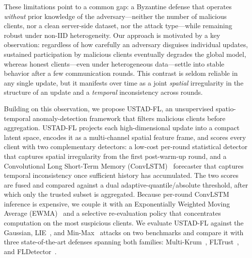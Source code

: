 \documentclass[journal]{IEEEtran}
\begin{document}
These limitations point to a common gap: a Byzantine defense that operates \emph{without} prior knowledge of the adversary---neither the number of malicious clients, nor a clean server-side dataset, nor the attack type---while remaining robust under non-IID heterogeneity. Our approach is motivated by a key observation: regardless of how carefully an adversary disguises individual updates, sustained participation by malicious clients eventually degrades the global model, whereas honest clients---even under heterogeneous data---settle into stable behavior after a few communication rounds. This contrast is seldom reliable in any single update, but it manifests over time as a joint \emph{spatial} irregularity in the structure of an update and a \emph{temporal} inconsistency across rounds.

Building on this observation, we propose USTAD-FL, an unsupervised spatio-temporal anomaly-detection framework that filters malicious clients before aggregation. USTAD-FL projects each high-dimensional update into a compact latent space, encodes it as a multi-channel spatial feature frame, and scores every client with two complementary detectors: a low-cost per-round statistical detector that captures spatial irregularity from the first post-warm-up round, and a Convolutional Long Short-Term Memory (ConvLSTM)~\cite{shi2015convolutional} forecaster that captures temporal inconsistency once sufficient history has accumulated. The two scores are fused and compared against a dual adaptive-quantile/absolute threshold, after which only the trusted subset is aggregated. Because per-round ConvLSTM inference is expensive, we couple it with an Exponentially Weighted Moving Average (EWMA)~\cite{hunter1986exponentially} and a selective re-evaluation policy that concentrates computation on the most suspicious clients. We evaluate USTAD-FL against the Gaussian, LIE~\cite{baruch2019little}, and Min-Max~\cite{shejwalkar2021manipulating} attacks on two benchmarks and compare it with three state-of-the-art defenses spanning both families: Multi-Krum~\cite{blanchard2017machine}, FLTrust~\cite{cao2020fltrust}, and FLDetector~\cite{zhang2022fldetector}.
\end{document}

